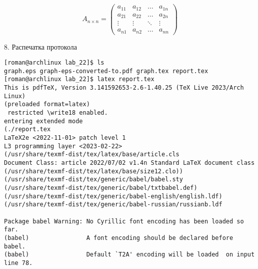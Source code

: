\documentclass[12pt]{article}
\begin{document}
\begin{equation}
A_{n \times n} = \left(
\begin{array}{cccc}
a_{11} & a_{12} & \ldots & a_{1n}\\
a_{21} & a_{22} & \ldots & a_{2n}\\
\vdots & \vdots & \ddots & \vdots\\
a_{n1} & a_{n2} & \ldots & a_{nn}
\end{array}
\right)
\end{equation}




{\Large 8. Распечатка протокола}


\begin{verbatim}
[roman@archlinux lab_22]$ ls
graph.eps graph-eps-converted-to.pdf graph.tex report.tex
[roman@archlinux lab_22]$ latex report.tex 
This is pdfTeX, Version 3.141592653-2.6-1.40.25 (TeX Live 2023/Arch Linux) 
(preloaded format=latex)
 restricted \write18 enabled.
entering extended mode
(./report.tex
LaTeX2e <2022-11-01> patch level 1
L3 programming layer <2023-02-22>
(/usr/share/texmf-dist/tex/latex/base/article.cls
Document Class: article 2022/07/02 v1.4n Standard LaTeX document class
(/usr/share/texmf-dist/tex/latex/base/size12.clo))
(/usr/share/texmf-dist/tex/generic/babel/babel.sty
(/usr/share/texmf-dist/tex/generic/babel/txtbabel.def)
(/usr/share/texmf-dist/tex/generic/babel-english/english.ldf)
(/usr/share/texmf-dist/tex/generic/babel-russian/russianb.ldf

Package babel Warning: No Cyrillic font encoding has been loaded so far.
(babel)                A font encoding should be declared before babel.
(babel)                Default `T2A' encoding will be loaded  on input line 78.



\end{verbatim}
\end{document}
